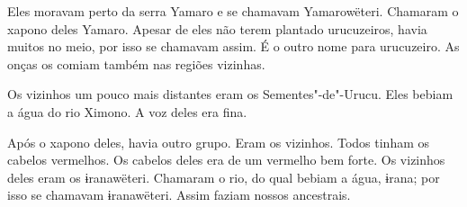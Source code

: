 Eles moravam perto da serra Yamaro e se chamavam Yamarowëteri. Chamaram
o xapono deles Yamaro. Apesar de eles não terem plantado urucuzeiros,
havia muitos no meio, por isso se chamavam assim. É o outro nome para
urucuzeiro. As onças os comiam também nas regiões vizinhas. 

Os vizinhos um pouco mais distantes eram os Sementes"-de"-Urucu. Eles
bebiam a água do rio Ximono. A voz deles era fina. 

Após o xapono deles, havia outro grupo. Eram os vizinhos. Todos tinham
os cabelos vermelhos. Os cabelos deles era de um vermelho bem forte. Os
vizinhos deles eram os ɨranawëteri. Chamaram o rio, do qual bebiam a
água, ɨrana; por isso se chamavam ɨranawëteri. Assim faziam nossos
ancestrais.
